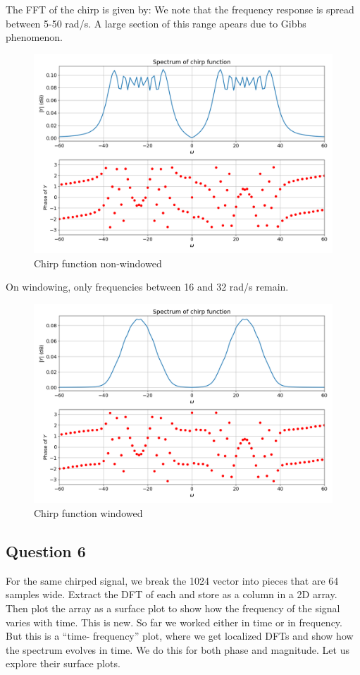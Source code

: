 \documentclass{article}
\begin{document}
The FFT of the chirp is given by:
We note that the frequency response is spread between 5-50 rad/s. A large section of this range apears due to Gibbs phenomenon. 

\begin{figure}[!tbh]
\centering
\includegraphics[scale=0.4]{plots/chirp_wo.png}
\caption{Chirp function non-windowed}
\label{fig:12}
\end{figure}

On windowing, only frequencies between 16 and 32 rad/s remain.


\begin{figure}[!tbh]
\centering
\includegraphics[scale=0.4]{plots/chirp_with.png}
\caption{Chirp function windowed}
\label{fig:13}
\end{figure}

\newpage
\subsection{Question 6}
For the same chirped signal, we break the 1024 vector into pieces that are 64 samples wide.
Extract the DFT of each and store as a column in a 2D array. Then plot the array as a surface plot to show how the frequency of the signal varies with time.
This is new. So far we worked either in time or in frequency. But this is a “time- frequency” plot, where we get localized DFTs and show how the spectrum evolves in time.
We do this for both phase and magnitude. Let us explore their surface plots. \\
\end{document}
